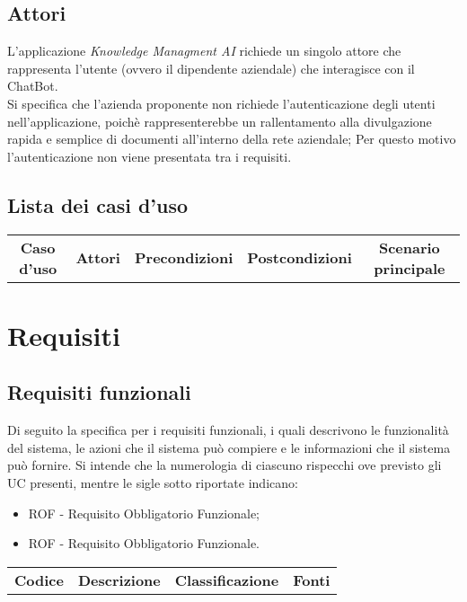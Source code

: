 \documentclass[10pt, a4paper]{article}
\begin{document}
\subsection{Attori}
L'applicazione \textit{Knowledge Managment AI} richiede un singolo attore che rappresenta l'utente (ovvero il dipendente aziendale) che interagisce con il ChatBot. \\ Si specifica che l'azienda proponente non richiede l'autenticazione degli utenti nell'applicazione, poichè rappresenterebbe un rallentamento alla divulgazione rapida e semplice di documenti all'interno della rete aziendale; Per questo motivo l'autenticazione non viene presentata tra i requisiti.
\subsection{Lista dei casi d'uso}

\renewcommand{\arraystretch}{1.5}
\begin{tabularx}{\textwidth}{|c|X|c|c|c|}\hline
\textbf{Caso d'uso} & \textbf{Attori} & \textbf{Precondizioni} & \textbf{Postcondizioni} & \textbf{Scenario principale} \\
\end{tabularx}


\newpage
\section{Requisiti}

\subsection{Requisiti funzionali}
Di seguito la specifica per i requisiti funzionali, i quali descrivono le funzionalità del sistema, le azioni
che il sistema può compiere e le informazioni che il sistema può fornire.
Si intende che la numerologia di ciascuno rispecchi ove previsto gli UC presenti, mentre le sigle sotto
riportate indicano:
\begin{itemize}
    \item ROF - Requisito Obbligatorio Funzionale;
    \item ROF - Requisito Obbligatorio Funzionale.
\end{itemize}
\renewcommand{\arraystretch}{1.5}
\begin{tabularx}{\textwidth}{|c|X|c|c|}\hline
\textbf{Codice} & \textbf{Descrizione} & \textbf{Classificazione} & \textbf{Fonti} \\
\end{tabularx}
\end{document}
